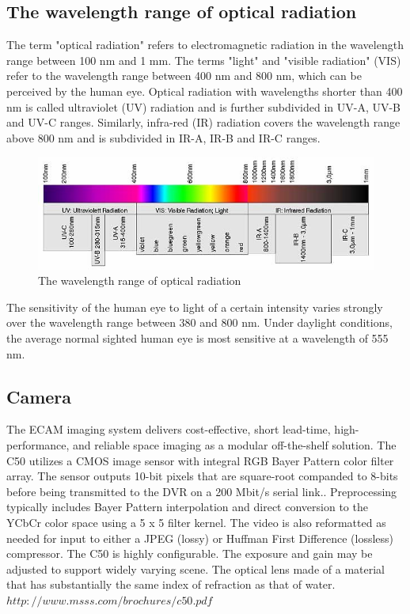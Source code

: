 \subsection{The wavelength range of optical radiation}

The term "optical radiation" refers to electromagnetic radiation in the wavelength range between 100 nm and 1 mm. The terms "light" and "visible radiation" (VIS) refer to the wavelength range between 400 nm and 800 nm, which can be perceived by the human eye. Optical radiation with wavelengths shorter than 400 nm is called ultraviolet (UV) radiation and is further subdivided in UV-A, UV-B and UV-C ranges. Similarly, infra-red (IR) radiation covers the wavelength range above 800 nm and is subdivided in IR-A, IR-B and IR-C ranges.

\begin{figure}[htb]
\centering
\includegraphics[scale=1]{figures/camera/bh8.jpg}
\caption{The wavelength range of optical radiation}
\end{figure}

The sensitivity of the human eye to light of a certain intensity varies strongly over the wavelength range between 380 and 800 nm. Under daylight conditions, the average normal sighted human eye is most sensitive at a wavelength of 555 nm.

\subsection{Camera}

The ECAM imaging system delivers cost-effective, short lead-time, high-performance, and reliable space imaging as a modular off-the-shelf solution. The C50 utilizes a CMOS image sensor with integral RGB Bayer Pattern color filter array. The sensor outputs 10-bit pixels that are square-root companded to 8-bits before being transmitted to the DVR on a 200 Mbit/s serial link.. Preprocessing typically includes Bayer Pattern interpolation and direct conversion to the YCbCr color space using a 5 x 5 filter kernel. The video is also reformatted as needed for input to either a JPEG (lossy) or Huffman First Difference (lossless) compressor. The C50 is highly configurable. The exposure and gain may be adjusted to support widely varying scene. The optical lens made of a material that has substantially the same index of refraction as that of water.$http://www.msss.com/brochures/c50.pdf$

